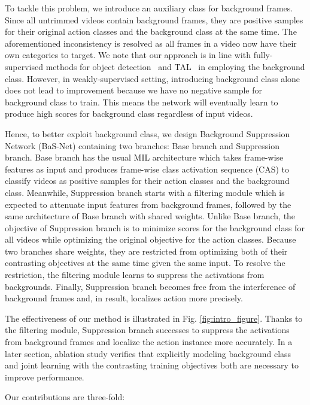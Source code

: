 \documentclass[letterpaper]{article} %
\newcommand{\Fref}[1]{Fig. \ref{#1}}
\begin{document}
To tackle this problem, we introduce an auxiliary class for background frames. Since all untrimmed videos contain background frames, they are positive samples for their original action classes and the background class at the same time. The aforementioned inconsistency is resolved as all frames in a video now have their own categories to target.
We note that our approach is in line with fully-supervised methods for object detection~\cite{ren2015faster,redmon2016you,liu2016ssd} and TAL~\cite{shou2016temporal,zhao2017temporal} in employing the background class.
However, in weakly-supervised setting, introducing background class alone does not lead to improvement because we have no negative sample for background class to train. This means the network will eventually learn to produce high scores for background class regardless of input videos. 

Hence, to better exploit background class, we design Background Suppression Network (BaS-Net) containing two branches: Base branch and Suppression branch.
Base branch has the usual MIL architecture which takes frame-wise features as input and produces frame-wise class activation sequence (CAS) to classify videos as positive samples for their action classes and the background class.
Meanwhile, Suppression branch starts with a filtering module which is expected to attenuate input features from background frames, followed by the same architecture of Base branch with shared weights. Unlike Base branch, the objective of Suppression branch is to minimize scores for the background class for all videos while optimizing the original objective for the action classes. Because two branches share weights, they are restricted from optimizing both of their contrasting objectives at the same time given the same input. To resolve the restriction, the filtering module learns to suppress the activations from backgrounds. Finally, Suppression branch becomes free from the interference of background frames and, in result, localizes action more precisely.

The effectiveness of our method is illustrated in \Fref{fig:intro_figure}. Thanks to the filtering module, Suppression branch successes to suppress the activations from background frames and localize the action instance more accurately. In a later section, ablation study verifies that explicitly modeling background class and joint learning with the contrasting training objectives both are necessary to improve performance.

Our contributions are three-fold:
\end{document}
